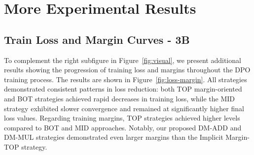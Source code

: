 \section{More Experimental Results}

\subsection{Train Loss and Margin Curves - 3B}
\label{app:loss}
To complement the right subfigure in Figure~\ref{fig:visual}, we present additional results showing the progression of training loss and margins throughout the DPO training process. The results are shown in Figure~\ref{fig:loss-margin}. All strategies demonstrated consistent patterns in loss reduction: both TOP margin-oriented and BOT strategies achieved rapid decreases in training loss, while the MID strategy exhibited slower convergence and remained at significantly higher final loss values. Regarding training margins, TOP strategies achieved higher levels compared to BOT and MID approaches. Notably, our proposed DM-ADD and DM-MUL strategies demonstrated even larger margins than the Implicit Margin-TOP strategy.


